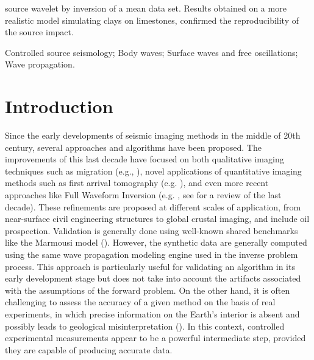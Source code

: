 \documentclass[extra,mreferee]{gji}
\begin{document}
\begin{summary}
source wavelet by inversion of a mean data set. Results obtained on a more realistic model simulating clays on limestones, confirmed the reproducibility of the source impact.


\end{summary}

\begin{keywords}
Controlled source seismology; Body waves; Surface waves and free oscillations; Wave propagation.
\end{keywords}

\section{Introduction}

Since the early developments of seismic imaging methods in the middle of 20th century, several approaches and algorithms have been proposed. The improvements of this last decade have focused on both qualitative imaging techniques such as migration (e.g., \cite{berkhout2012mss,guofeng2013gpu}), novel applications of quantitative imaging methods such as first arrival tomography (e.g. \cite{bohm2015cws}), and even more recent approaches like Full Waveform Inversion (e.g. \cite{perez2014awi}, see \cite{virieux2009fwi} for a review of the last decade). These refinements are proposed at different scales of application, from near-surface civil engineering structures to global crustal imaging, and include oil prospection. Validation is generally done using well-known shared benchmarks like the Marmousi model (\cite{martin2006marmousi2}). However, the synthetic data are generally computed using the same wave propagation modeling engine used in the inverse problem process. This approach is particularly useful for validating an algorithm in its early development stage but does not take into account the artifacts associated with the assumptions of the forward problem. On the other hand, it is often challenging to assess the accuracy of a given method on the basis of real experiments, in which precise information on the Earth's interior is absent and possibly leads to geological misinterpretation (\cite{morozov2004arf}). In this context, controlled experimental measurements appear to be a powerful intermediate step, provided they are capable of producing accurate data.
\end{document}

